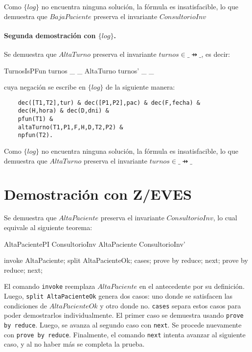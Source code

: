 \documentclass[12pt]{article}
\newcommand{\setlog}{$\{log\}$\xspace}
\begin{document}
Como \setlog no encuentra ninguna solución, la fórmula es insatisfacible, lo que demuestra que $BajaPaciente$ preserva el invariante $ConsultorioInv$

\paragraph{Segunda demostración con \setlog.}

Se demuestra que $AltaTurno$ preserva el invariante $turnos \in \_ \pfun \_$, es decir:

\begin{theorem}{TurnosIsPFun}
    turnos \in \_ \pfun \_ \land AltaTurno \implies turnos' \in \_ \pfun \_
\end{theorem}

cuya negación se escribe en \setlog de la siguiente manera:

\begin{verbatim}
    dec([T1,T2],tur) & dec([P1,P2],pac) & dec(F,fecha) &
    dec(H,hora) & dec(D,dni) &
    pfun(T1) &
    altaTurno(T1,P1,F,H,D,T2,P2) &
    npfun(T2).
\end{verbatim}

Como \setlog no encuentra ninguna solución, la fórmula es insatisfacible, lo que demuestra que $AltaTurno$ preserva el invariante $turnos \in \_ \pfun \_$

\section*{Demostración con Z/EVES}

Se demuestra que $AltaPaciente$ preserva el invariante $ConsultorioInv$, lo cual equivale al siguiente teorema:

\begin{theorem}{AltaPacientePI}
    ConsultorioInv \land AltaPaciente \implies ConsultorioInv'
\end{theorem}

\begin{zproof}[AltaPacientePI]
invoke AltaPaciente;
split AltaPacienteOk;
cases;
prove by reduce;
next;
prove by reduce;
next;
\end{zproof}

El comando \verb|invoke| reemplaza $AltaPaciente$ en el antecedente por su definición. Luego, \verb|split AltaPacienteOk| genera dos casos: uno donde se satisfacen las condiciones de $AltaPacienteOk$ y otro donde no. \verb|cases| separa estos casos para poder demostrarlos individualmente. El primer caso se demuestra usando \verb|prove by reduce|. Luego, se avanza al segundo caso con \verb|next|. Se procede nuevamente con \verb|prove by reduce|. Finalmente, el comando \verb|next| intenta avanzar al siguiente caso, y al no haber más se completa la prueba.
\end{document}
